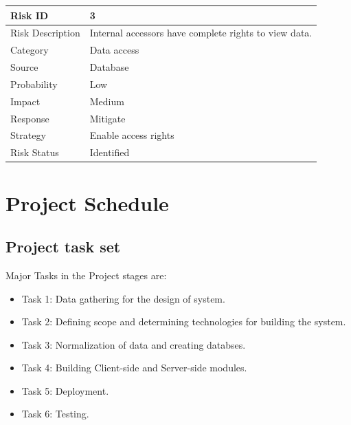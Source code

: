 \documentclass[oneside,a4paper,12pt]{book}
\begin{document}
\begin{table}[!htbp]
\begin{center}
\def\arraystretch{1.5}
\begin{tabularx}{\textwidth}{| l | X |}
\hline 
Risk ID	& 3 \\ \hline
Risk Description	& Internal accessors have complete rights to view data. \\ \hline
Category	& Data access \\ \hline
Source	& Database \\ \hline
Probability	& Low \\ \hline
Impact	& Medium \\ \hline
Response	& Mitigate \\ \hline
Strategy	& Enable access rights  \\ \hline
Risk Status	& Identified \\ \hline
\end{tabularx}
\end{center}
\label{tab:risk3}
\end{table}

\section{Project Schedule}  
\subsection{Project task set}  
Major Tasks in the Project stages are:
\begin{itemize}
  \item Task 1: Data gathering for the design of system.
  \item Task 2: Defining scope and determining technologies for building the system.
  \item Task 3: Normalization of data and creating databses.
  \item Task 4: Building Client-side and Server-side modules.
  \item Task 5: Deployment.
  \item Task 6: Testing.
\end{itemize}
\end{document}
